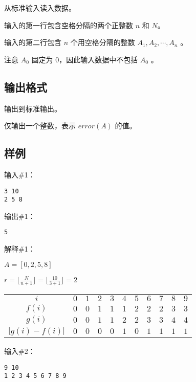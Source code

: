 从标准输入读入数据。

输入的第一行包含空格分隔的两个正整数 $n$ 和 $N$。

输入的第二行包含 $n$ 个用空格分隔的整数 $A_1,A_2,\cdots,A_n$
。

注意 $A_0$
 固定为 $0$，因此输入数据中不包括 $A_0$
。

\subsection*{输出格式}

输出到标准输出。

仅输出一个整数，表示 $error(A)$ 的值。

\subsection*{样例}

输入\#1：

\begin{lstlisting}
3 10
2 5 8
\end{lstlisting}

输出\#1：

\begin{lstlisting}
5
\end{lstlisting}

解释\#1：

$A=[0, 2, 5, 8]$

$r = \lfloor \frac{N}{n+1}\rfloor=\lfloor \frac{10}{3+1}\rfloor=2$

\begin{table}[H]
  \centering
  \begin{tabular}{ccccccccccc}
    \toprule
    $i$ & $0$ & $1$ & $2$ & $3$ & $4$ & $5$ & $6$ & $7$ & $8$ & $9$ \\
    $f(i)$ & $0$ & $0$ & $1$ & $1$ & $1$ & $2$ & $2$ & $2$ & $3$ & $3$ \\
    $g(i)$ & $0$ & $0$ & $1$ & $1$ & $2$ & $2$ & $3$ & $3$ & $4$ & $4$ \\
    $|g(i)-f(i)|$ & $0$ & $0$ & $0$ & $0$ & $1$ & $0$ & $1$ & $1$ & $1$ & $1$ \\
    \bottomrule
  \end{tabular}
\end{table}

输入\#2：

\begin{lstlisting}
9 10
1 2 3 4 5 6 7 8 9
\end{lstlisting}

